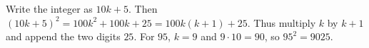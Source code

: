 Write the integer as $10k+5$. Then $(10k+5)^2=100k^2+100k+25=100k(k+1)+25$. Thus multiply $k$ by $k+1$ and append the two digits $25$. For $95$, $k=9$ and $9\cdot10=90$, so $\boxed{95^2=9025}$.
